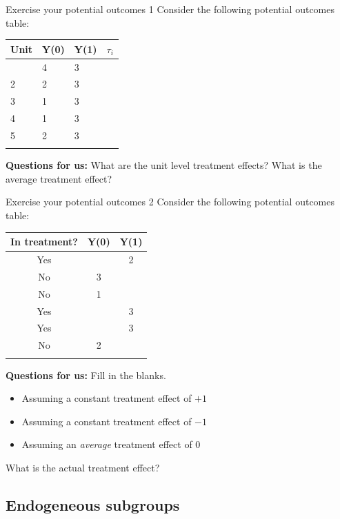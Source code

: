 \documentclass[
  11pt,
  ignorenonframetext,
]{beamer}
\providecommand{\tightlist}{%
  \setlength{\itemsep}{0pt}\setlength{\parskip}{0pt}}\usepackage{longtable,booktabs,array}
\begin{document}
\begin{frame}{Exercise your potential outcomes 1}
\protect\hypertarget{exercise-your-potential-outcomes-1}{}
Consider the following potential outcomes table:

\begin{longtable}[]{@{}llll@{}}
\toprule\noalign{}
Unit & Y(0) & Y(1) & \(\tau_i\) \\
\midrule\noalign{}
\endhead
1 & 4 & 3 & \\
2 & 2 & 3 & \\
3 & 1 & 3 & \\
4 & 1 & 3 & \\
5 & 2 & 3 & \\
\bottomrule\noalign{}
\end{longtable}

\textbf{Questions for us:} What are the unit level treatment effects?
What is the average treatment effect?
\end{frame}

\begin{frame}{Exercise your potential outcomes 2}
\protect\hypertarget{exercise-your-potential-outcomes-2}{}
Consider the following potential outcomes table:

\begin{longtable}[]{@{}ccc@{}}
\toprule\noalign{}
In treatment? & Y(0) & Y(1) \\
\midrule\noalign{}
\endhead
Yes & & 2 \\
No & 3 & \\
No & 1 & \\
Yes & & 3 \\
Yes & & 3 \\
No & 2 & \\
\bottomrule\noalign{}
\end{longtable}

\textbf{Questions for us: } Fill in the blanks.

\begin{itemize}
\tightlist
\item
  Assuming a constant treatment effect of \(+1\)
\item
  Assuming a constant treatment effect of \(-1\)
\item
  Assuming an \textit{average} treatment effect of \(0\)
\end{itemize}

What is the actual treatment effect?
\end{frame}

\hypertarget{endogeneous-subgroups}{%
\subsection{\texorpdfstring{Endogeneous subgroups
\label{subs}}{Endogeneous subgroups }}\label{endogeneous-subgroups}}
\end{document}
